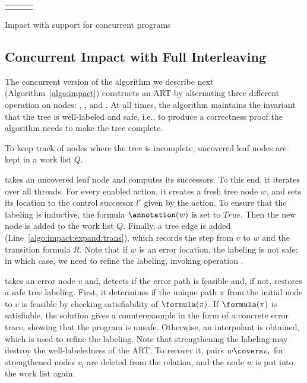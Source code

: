 \documentclass[conference]{IEEEtran}
\begin{document}
\begin{algorithm*}
\begin{tabular}{p{}p{}p{}}
\begin{algorithmic}[1]
\EndProcedure 

\end{algorithmic}
\end{tabular}
\vspace{-.5cm}
\caption{Impact with support for concurrent programs\label{algo:impact}}
\end{algorithm*}

\subsection{Concurrent Impact with Full Interleaving}
The concurrent version of the \impact algorithm we describe next
(Algorithm~\ref{algo:impact}) constructs an ART by alternating 
three different operation on nodes: , , and .
At all times, the algorithm maintains the invariant that the tree is well-labeled and safe,
i.e., to produce a correctness proof the algorithm needs to make the tree complete.

To keep track of nodes where the tree is incomplete,
uncovered leaf nodes are kept in a work list $Q$.

 takes an uncovered leaf node and computes its successors.
     To this end, it iterates over all threads.  For every enabled action,
     it creates a fresh tree node $w$, and sets its location to the control
     successor $l'$ given by the action.  To ensure that the labeling is
     inductive, the formula $\annotation(w)$ is set to $\mathit{True}$.  Then
     the new node is added to the work list $Q$.  Finally, a tree edge is
     added (Line~\ref{algo:impact:expand:trans}), which records the step from
     $v$ to $w$ and the transition formula $R$.  Note that if $w$ is an
     error location, the labeling is not safe; in which case, we need to
     refine the labeling, invoking operation .
          
 takes an error node $v$ and, detects if the error path is feasible
     and, if not, restores a safe tree labeling.  First, it determines if
     the unique path $\pi$ from the initial node to $v$ is feasible by
     checking satisfiability of $\formula(\pi)$.  If $\formula(\pi)$ is
     satisfiable, the solution gives a counterexample in the form of a
     concrete error trace, showing that the program is unsafe. Otherwise, an
     interpolant is obtained, which is used to refine the labeling.  Note
     that strengthening the labeling may destroy the well-labeledness of the
     ART.  To recover it, pairs $w \covers v_i$ for strengthened nodes $v_i$
     are deleted from the relation, and the node $w$ is put into the work
     list again.
\end{document}
